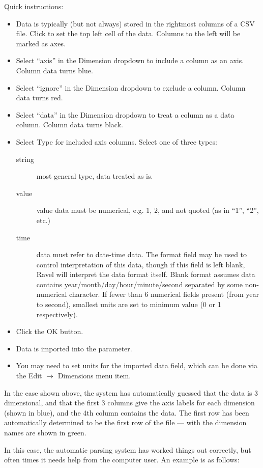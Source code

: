 Quick instructions: 
\begin{itemize}
\item Data is typically (but not always) stored in the rightmost columns
of a CSV file. Click to set the top left cell of the data. Columns
to the left will be marked as axes. 
\item Select ``axis'' in the Dimension dropdown to include a column as
an axis. Column data turns blue. 
\item Select ``ignore'' in the Dimension dropdown to exclude a column.
Column data turns red. 
\item Select ``data'' in the Dimension dropdown to treat a column as a
data column. Column data turns black. 
\item Select Type for included axis columns. Select one of three types: 
\begin{description}
\item [{string}] most general type, data treated as is. 
\item [{value}] value data must be numerical, e.g. 1, 2, and not quoted
(as in ``1'', ``2'', etc.)
\item [{time}] data must refer to date-time data. The format field may
be used to control interpretation of this data, though if this field
is left blank, Ravel will interpret the data format itself. Blank
format assumes data contains year/month/day/hour/minute/second separated
by some non-numerical character. If fewer than 6 numerical fields
present (from year to second), smallest units are set to minimum value
(0 or 1 respectively). 
\end{description}
\item Click the OK button. 
\item Data is imported into the parameter. 
\item You may need to set units for the imported data field, which can be
done via the Edit $\rightarrow$ Dimensions menu item.
\end{itemize}
In the case shown above, the system has automatically guessed that
the data is 3 dimensional, and that the first 3 columns give the axis
labels for each dimension (shown in blue), and the 4th column contains
the data. The first row has been automatically determined to be the
first row of the file --- with the dimension names are shown in green.

In this case, the automatic parsing system has worked things out correctly,
but often times it needs help from the computer user. An example is
as follows:
\begin{center}
\par\end{center}

